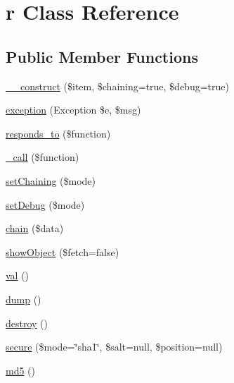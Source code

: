 \hypertarget{class_pierce_moore_1_1_ruby_p_h_p_1_1r}{\section{r Class Reference}
\label{class_pierce_moore_1_1_ruby_p_h_p_1_1r}
}
\subsection*{Public Member Functions}
\begin{DoxyCompactItemize}
\item 
\hyperlink{class_pierce_moore_1_1_ruby_p_h_p_1_1r_a8eccda0f4101f0aa413909212888ff20}{\-\_\-\-\_\-construct} (\$item, \$chaining=true, \$debug=true)
\item 
\hyperlink{class_pierce_moore_1_1_ruby_p_h_p_1_1r_ac53bb6cc3dad129127779798eb479903}{exception} (Exception \$e, \$msg)
\item 
\hyperlink{class_pierce_moore_1_1_ruby_p_h_p_1_1r_ae9afa34c455aa79da5394a608f38386e}{responds\-\_\-to} (\$function)
\item 
\hyperlink{class_pierce_moore_1_1_ruby_p_h_p_1_1r_af4b09312c3dd2b7ef02781c54c9a5244}{\-\_\-call} (\$function)
\item 
\hyperlink{class_pierce_moore_1_1_ruby_p_h_p_1_1r_a44475d97f032201263e0d481271b9882}{set\-Chaining} (\$mode)
\item 
\hyperlink{class_pierce_moore_1_1_ruby_p_h_p_1_1r_a3a01c4bf259b32b45ac96f980f50776b}{set\-Debug} (\$mode)
\item 
\hyperlink{class_pierce_moore_1_1_ruby_p_h_p_1_1r_afb92656ab6eed3bbf9abb7b75498e2e1}{chain} (\$data)
\item 
\hyperlink{class_pierce_moore_1_1_ruby_p_h_p_1_1r_a979fd6f54086be01e4bdb059b26cec66}{show\-Object} (\$fetch=false)
\item 
\hyperlink{class_pierce_moore_1_1_ruby_p_h_p_1_1r_af745c1e6bc71ed38a120043c0cb13416}{val} ()
\item 
\hyperlink{class_pierce_moore_1_1_ruby_p_h_p_1_1r_a5bf63e4ac70cfd9d97e3f2eab936ec8b}{dump} ()
\item 
\hyperlink{class_pierce_moore_1_1_ruby_p_h_p_1_1r_aa118461de946085fe42989193337044a}{destroy} ()
\item 
\hyperlink{class_pierce_moore_1_1_ruby_p_h_p_1_1r_a983a9fa784e9028dea46897a760f1210}{secure} (\$mode=\char`\"{}sha1\char`\"{}, \$salt=null, \$position=null)
\item 
\hyperlink{class_pierce_moore_1_1_ruby_p_h_p_1_1r_a63b637e71bf8bbee33889ae833423560}{md5} ()

\end{DoxyCompactItemize}
